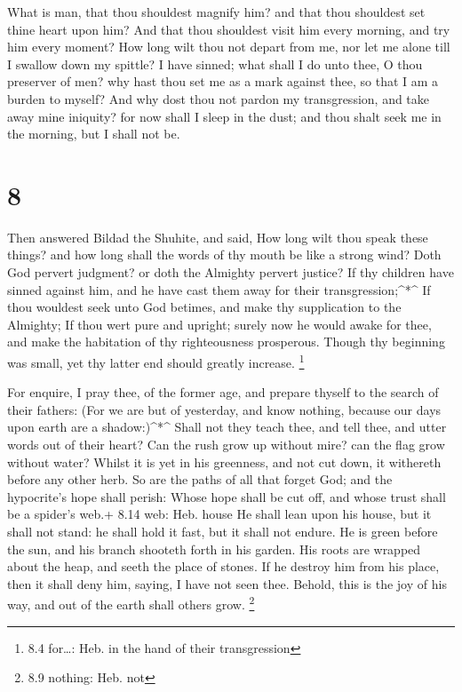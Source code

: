  What is man, that thou shouldest magnify him? and that
thou shouldest set thine heart upon him?  And that thou
shouldest visit him every morning, and try him every moment?
 How long wilt thou not depart from me, nor let me alone
till I swallow down my spittle?  I have sinned; what shall
I do unto thee, O thou preserver of men? why hast thou set me as a mark
against thee, so that I am a burden to myself?  And why
dost thou not pardon my transgression, and take away mine iniquity? for
now shall I sleep in the dust; and thou shalt seek me in the morning,
but I shall not be.

\hypertarget{section-7}{%
\section{8}\label{section-7}}

 Then answered Bildad the Shuhite, and said, 
How long wilt thou speak these things? and how long shall the words of
thy mouth be like a strong wind?  Doth God pervert judgment?
or doth the Almighty pervert justice?  If thy children have
sinned against him, and he have cast them away for their
transgression;\^{}*\^{}  If thou wouldest seek unto God
betimes, and make thy supplication to the Almighty;  If thou
wert pure and upright; surely now he would awake for thee, and make the
habitation of thy righteousness prosperous.  Though thy
beginning was small, yet thy latter end should greatly increase.
\footnote{8.4 for\ldots: Heb. in the hand of their transgression}

 For enquire, I pray thee, of the former age, and prepare
thyself to the search of their fathers:  (For we are but of
yesterday, and know nothing, because our days upon earth are a
shadow:)\^{}*\^{}  Shall not they teach thee, and tell
thee, and utter words out of their heart?  Can the rush
grow up without mire? can the flag grow without water? 
Whilst it is yet in his greenness, and not cut down, it withereth before
any other herb.  So are the paths of all that forget God;
and the hypocrite's hope shall perish:  Whose hope shall be
cut off, and whose trust shall be a spider's web.+ 8.14 web: Heb. house
 He shall lean upon his house, but it shall not stand: he
shall hold it fast, but it shall not endure.  He is green
before the sun, and his branch shooteth forth in his garden.
 His roots are wrapped about the heap, and seeth the place
of stones.  If he destroy him from his place, then it shall
deny him, saying, I have not seen thee.  Behold, this is
the joy of his way, and out of the earth shall others grow. \footnote{8.9
  nothing: Heb. not}


